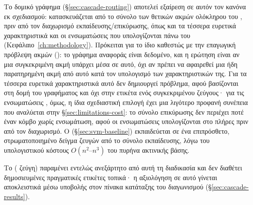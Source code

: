 Το δομικό γράφημα (\S\ref{sec:cascade-routing}) αποτελεί εξαίρεση σε αυτόν τον κανόνα
εκ σχεδιασμού: κατασκευάζεται από το σύνολο των θετικών ακμών ολόκληρου του
\texttt{}, πριν από τον διαχωρισμό εκπαίδευσης/επικύρωσης, όπως και τα
τέσσερα ευρετικά χαρακτηριστικά και οι ενσωματώσεις  που
υπολογίζονται πάνω του (Κεφάλαιο~\ref{ch:methodology}). Πρόκειται για το ίδιο
καθεστώς με την επαγωγική πρόβλεψη ακμών (): το γράφημα
αναφοράς είναι δεδομένο, και η ερώτηση είναι αν μια συγκεκριμένη ακμή υπάρχει μέσα
σε αυτό, όχι αν πρέπει να αφαιρεθεί μια ήδη παρατηρημένη ακμή από αυτό κατά τον
υπολογισμό των χαρακτηριστικών της.
Για τα τέσσερα ευρετικά χαρακτηριστικά αυτό δεν
δημιουργεί πρόβλημα, αφού βασίζονται στη δομή του γραφήματος και όχι στην ετικέτα ενός
συγκεκριμένου ζεύγους· για τις ενσωματώσεις , όμως, η ίδια σχεδιαστική
επιλογή έχει μια λιγότερο προφανή συνέπεια που αναλύεται στην
\S\ref{sec:limitations-cost}: το σύνολο επικύρωσης δεν περιέχει ποτέ έναν κόμβο
χωρίς ενσωμάτωση, αφού οι ενσωματώσεις υπολογίζονται στο πλήρες
\texttt{} πριν από τον διαχωρισμό.
Ο \texttt{}
(\S\ref{sec:svm-baseline}) εκπαιδεύεται σε ένα επιπρόσθετο, στρωματοποιημένο
δείγμα \SvmSampleSize{} ζευγών από το σύνολο εκπαίδευσης, λόγω του υπολογιστικού κόστους
$O(n^2\text{--}n^3)$ του  πυρήνα ακτινικής βάσης.

Το \texttt{} (\TestPairs{} ζεύγη) παραμένει εντελώς ανεξάρτητο από αυτή τη
διαδικασία και δεν διαθέτει δημοσιευμένες πραγματικές ετικέτες τοπικά· η αξιολόγηση
σε αυτό γίνεται αποκλειστικά μέσω υποβολής στον πίνακα κατάταξης  του
διαγωνισμού (\S\ref{sec:cascade-results}).

